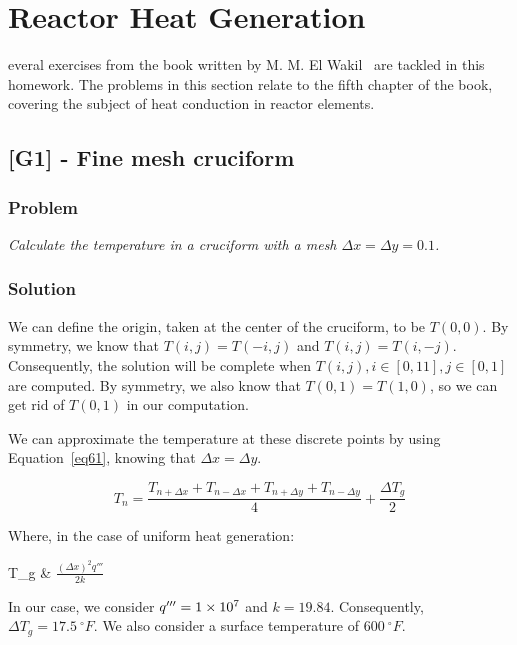 %
%
\let\textcircled=\pgftextcircled
\chapter{Reactor Heat Generation}
\label{chap:intro}

everal exercises from the book written by M. M. El Wakil~\cite{book01} are tackled in this homework. The problems in this section relate to the fifth chapter of the book, covering the subject of heat conduction in reactor elements.

\section{[G1] - Fine mesh cruciform}
\label{prob51}

\subsection{Problem}
\textit{Calculate the temperature in a cruciform with a mesh $\Delta x = \Delta y = 0.1$.}

\subsection{Solution}

We can define the origin, taken at the center of the cruciform, to be $T(0,0)$. By symmetry, we know that $T(i,j) = T(-i,j)$ and $T(i,j) = T(i,-j)$. Consequently, the solution will be complete when $T(i,j), i \in [0, 11], j \in [0,1]$ are computed. By symmetry, we also know that $T(0,1) = T(1,0)$, so we can get rid of $T(0,1)$ in our computation.

We can approximate the temperature at these discrete points by using Equation~\ref{eq61}, knowing that $\Delta x = \Delta y$.

\begin{equation}\label{eq61}
T_n = \frac{T_{n+\Delta x} + T_{n-\Delta x} + T_{n+\Delta y} + T_{n-\Delta y}}{4} + \frac{\Delta T_g}{2}
\end{equation}

Where, in the case of uniform heat generation:

\begin{conditions}
\Delta T_g & $\frac{(\Delta x)^2 q'''}{2k}$
\end{conditions}

In our case, we consider $q''' = \text{\num{1e7}}$ and $k = 19.84$. Consequently, $\Delta T_g = 17.5\ {}^\circ F$. We also consider a surface temperature of $600\ {}^\circ F$.

